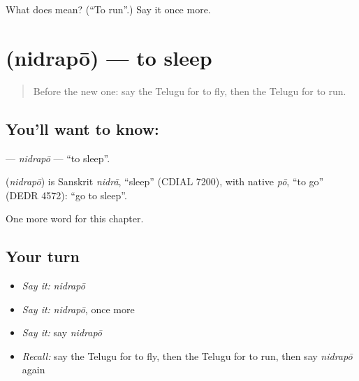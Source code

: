 \begin{tcolorbox}[breakable,colback=teal!4,colframe=teal!35!black,title={Before you move on}]
What does  mean? (\textquotedblleft{}To run\textquotedblright{}.) Say it once more.
\end{tcolorbox}
\section[\texorpdfstring{\te{నిద్రపో} (nidrapō)}{నిద్రపో (nidrapō)}]{ (nidrapō) — to sleep}

\label{lesson:TE-C143-nidrapo}



\begin{quote}
Before the new one: say the Telugu for to fly, then the Telugu for to run.
\end{quote}

\subsection*{You'll want to know: }
\textbf{} — \emph{nidrapō} — \textquotedblleft{}to sleep\textquotedblright{}.

\begin{cousinweb}
\textbf{} (\emph{nidrapō}) is Sanskrit \emph{nidrā}, \textquotedblleft{}sleep\textquotedblright{} (CDIAL 7200), with native \emph{pō}, \textquotedblleft{}to go\textquotedblright{} (DEDR 4572): \textquotedblleft{}go to sleep\textquotedblright{}.
\end{cousinweb}

\begin{grammarlens}[title={What you've built}]
One more word for this chapter.
\end{grammarlens}

\subsection*{Your turn}
\begin{itemize}
\raggedright
  \item \emph{Say it:} \emph{nidrapō}
  \item \emph{Say it:} \emph{nidrapō}, once more
  \item \emph{Say it:} say \emph{nidrapō}
  \item \emph{Recall:} say the Telugu for to fly, then the Telugu for to run, then say \emph{nidrapō} again
\end{itemize}

